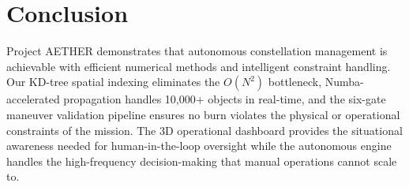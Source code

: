 \documentclass[11pt, a4paper]{article}
\begin{document}
\section{Conclusion}

Project AETHER demonstrates that autonomous constellation management is achievable with efficient numerical methods and intelligent constraint handling. Our KD-tree spatial indexing eliminates the $O(N^2)$ bottleneck, Numba-accelerated propagation handles 10{,}000+ objects in real-time, and the six-gate maneuver validation pipeline ensures no burn violates the physical or operational constraints of the mission. The 3D operational dashboard provides the situational awareness needed for human-in-the-loop oversight while the autonomous engine handles the high-frequency decision-making that manual operations cannot scale to.
\end{document}
